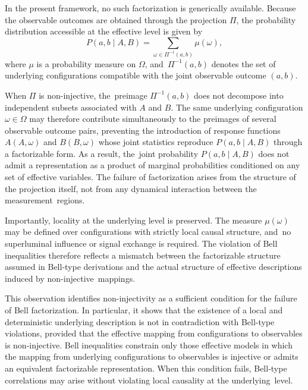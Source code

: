 \documentclass[11pt,a4paper]{article}
\theoremstyle{remark}
\begin{document}
    In the present framework, no such factorization is generically available.
    Because the observable outcomes are obtained through the projection $\Pi$,
    the probability distribution accessible at the effective level is given by
\begin{equation}
      P(a,b \mid A,B) =
      \sum_{\omega \in \Pi^{-1}(a,b)}
      \mu(\omega),
    \end{equation}
    where $\mu$ is a probability measure on $\Omega$, and~$\Pi^{-1}(a,b)$ denotes the
    set of underlying configurations compatible with the joint observable outcome $(a,b)$.

    When $\Pi$ is non-injective, the~preimage $\Pi^{-1}(a,b)$ does not decompose into
    independent subsets associated with $A$ and $B$.
    The same underlying configuration $\omega \in \Omega$ may therefore
    contribute simultaneously to the preimages of several observable
    outcome pairs, preventing the introduction of response functions
    $A(A,\omega)$ and $B(B,\omega)$ whose joint statistics reproduce
    $P(a,b\mid A,B)$ through a factorizable form.
    As a result, the~joint probability $P(a,b \mid A,B)$ does not admit a representation
    as a product of marginal probabilities conditioned on any set of effective variables.
    The failure of factorization arises from the structure of the projection itself,
    not from any dynamical interaction between the measurement~regions.

    Importantly, locality at the underlying level is preserved.
    The measure $\mu(\omega)$ may be defined over configurations with strictly local
    causal structure, and~no superluminal influence or signal exchange is required.
    The violation of Bell inequalities therefore reflects a mismatch between the
    factorizable structure assumed in Bell-type derivations and the actual structure
    of effective descriptions induced by non-injective~mappings.

    This observation identifies non-injectivity as a sufficient condition for the
    failure of Bell factorization.
    In particular, it shows that the existence of a local and deterministic underlying
    description is not in contradiction with Bell-type violations, provided that the
    effective mapping from configurations to observables is non-injective.
    Bell inequalities constrain only those effective models in which the mapping
    from underlying configurations to observables is injective or admits an equivalent
    factorizable representation.
    When this condition fails, Bell-type correlations may arise without violating
    local causality at the underlying~level.
\end{document}
